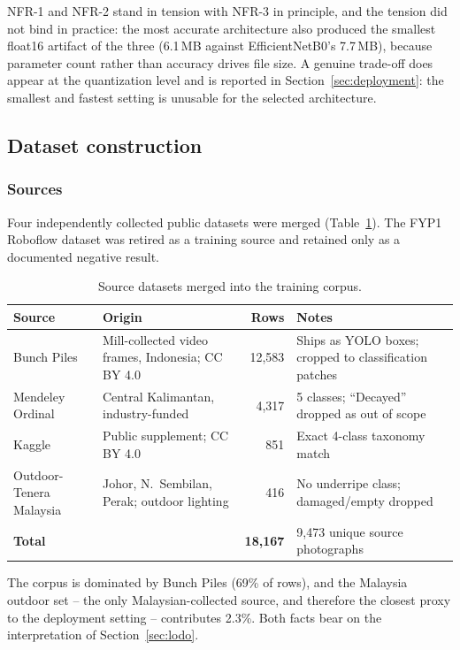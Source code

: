 \documentclass{article}
\begin{document}
NFR-1 and NFR-2 stand in tension with NFR-3 in principle, and the tension did not bind in practice: the
most accurate architecture also produced the smallest float16 artifact of the three (6.1\,MB against
EfficientNetB0's 7.7\,MB), because parameter count rather than accuracy drives file size. A genuine
trade-off does appear at the quantization level and is reported in Section~\ref{sec:deployment}: the
smallest and fastest setting is unusable for the selected architecture.

\subsection{Dataset construction}
\label{sec:construction}

\subsubsection{Sources}

Four independently collected public datasets were merged (Table~\ref{tab:sources}). The FYP1 Roboflow
dataset was retired as a training source and retained only as a documented negative result.

\begin{table}[t]
\centering
\caption{Source datasets merged into the training corpus.}
\label{tab:sources}
\begin{tabular}{@{}p{3.1cm}p{4.4cm}rp{4.4cm}@{}}
\toprule
Source & Origin & Rows & Notes \\
\midrule
Bunch Piles \citep{suharjito2020bunchpiles} & Mill-collected video frames, Indonesia; CC BY 4.0 & 12{,}583 & Ships as YOLO boxes; cropped to classification patches \\
Mendeley Ordinal \citep{kamal2024mendeley} & Central Kalimantan, industry-funded & 4{,}317 & 5 classes; ``Decayed'' dropped as out of scope \\
Kaggle \citep{hadeemadadum_kaggle} & Public supplement; CC BY 4.0 & 851 & Exact 4-class taxonomy match \\
Outdoor-Tenera Malaysia \citep{rosbi_outdoor_tenera} & Johor, N.\ Sembilan, Perak; outdoor lighting & 416 & No underripe class; damaged/empty dropped \\
\midrule
\textbf{Total} & & \textbf{18{,}167} & 9{,}473 unique source photographs \\
\bottomrule
\end{tabular}
\end{table}

The corpus is dominated by Bunch Piles (69\% of rows), and the Malaysia outdoor set -- the only
Malaysian-collected source, and therefore the closest proxy to the deployment setting -- contributes
2.3\%. Both facts bear on the interpretation of Section~\ref{sec:lodo}.
\end{document}
